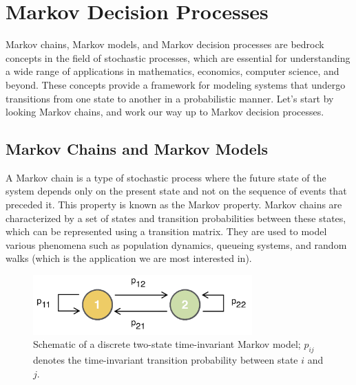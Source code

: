 \documentclass[11pt]{article}
\theoremstyle{definition}
\begin{document}
\section{Markov Decision Processes}\label{sec:markov-decision-processes}
Markov chains, Markov models, and Markov decision processes are bedrock concepts in the field of stochastic processes, which are essential for understanding a wide range of applications in mathematics, economics, computer science, and beyond. 
These concepts provide a framework for modeling systems that undergo transitions from one state to another in a probabilistic manner.
Let's start by looking Markov chains, and work our way up to Markov decision processes.

\subsection{Markov Chains and Markov Models}
A Markov chain is a type of stochastic process where the future state of the system depends only on the present state and not on the sequence of events that preceded it. 
This property is known as the Markov property. 
Markov chains are characterized by a set of states and transition probabilities between these states, 
which can be represented using a transition matrix. They are used to model various phenomena such as population dynamics, queueing systems, and random walks (which is the application we are most interested in).


\begin{figure}[h]
    \centering
    \includegraphics[width=0.75\textwidth]{./figs/Fig-Discrete-MarkovChain-Schematic.pdf}
    \caption{Schematic of a discrete two-state time-invariant Markov model; 
    $p_{ij}$ denotes the time-invariant transition probability between state $i$ and $j$.}\label{fig-discrete-markov-model}
\end{figure}
\end{document}
